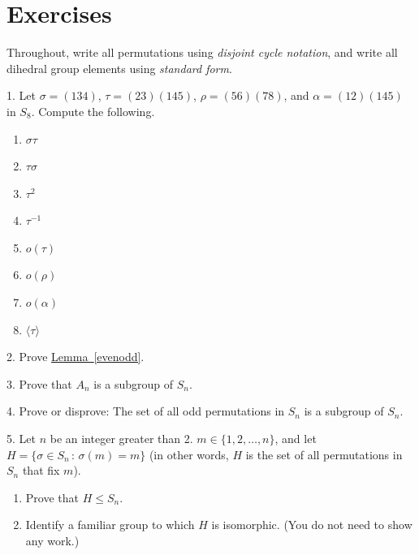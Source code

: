 \documentclass[10pt,]{book}
\theoremstyle{plain}
\theoremstyle{definition}
\theoremstyle{definition}
\theoremstyle{definition}
\theoremstyle{definition}
\numberwithin{equation}{section}
\begin{document}
\section[{Exercises}]{Exercises}\label{exercises-7}
Throughout, write all permutations using \emph{disjoint cycle notation}, and write all dihedral group elements using \emph{standard form}.%
\begin{exerciselist}
\item[1.]\hypertarget{exercise-41}{}Let \(\sigma=(134)\), \(\tau=(23)(145)\), \(\rho=(56)(78)\), and \(\alpha=(12)(145)\) in \(S_8\). Compute the following. \leavevmode%
\begin{enumerate}[label=(\alph*)]
\item\hypertarget{li-351}{}\(\sigma \tau\)%
\item\hypertarget{li-352}{}\(\tau \sigma\)%
\item\hypertarget{li-353}{}\(\tau^2\)%
\item\hypertarget{li-354}{}\(\tau^{-1}\)%
\item\hypertarget{li-355}{}\(o(\tau)\)%
\item\hypertarget{li-356}{}\(o(\rho)\)%
\item\hypertarget{li-357}{}\(o(\alpha)\)%
\item\hypertarget{li-358}{}\(\langle \tau\rangle\)%
\end{enumerate}
%
\par\smallskip
\item[2.]\hypertarget{exercise-42}{}Prove \hyperref[evenodd]{Lemma~\ref{evenodd}}.%
\par\smallskip
\item[3.]\hypertarget{exercise-43}{}Prove that \(A_n\) is a subgroup of \(S_n\).%
\par\smallskip
\item[4.]\hypertarget{exercise-44}{}Prove or disprove: The set of all odd permutations in \(S_n\) is a subgroup of \(S_n\).%
\par\smallskip
\item[5.]\hypertarget{exercise-45}{}Let \(n\) be an integer greater than 2. \(m \in \{1,2,\ldots,n\}\), and let \(H=\{\sigma\in S_n\,:\,\sigma(m)=m\}\) (in other words, \(H\) is the set of all permutations in \(S_n\) that fix \(m\)). \leavevmode%
\begin{enumerate}[label=(\alph*)]
\item\hypertarget{li-367}{}Prove that \(H\leq S_n\).%
\item\hypertarget{li-368}{}Identify a familiar group to which \(H\) is isomorphic. (You do not need to show any work.)%

\end{enumerate}
\end{exerciselist}
\end{document}
